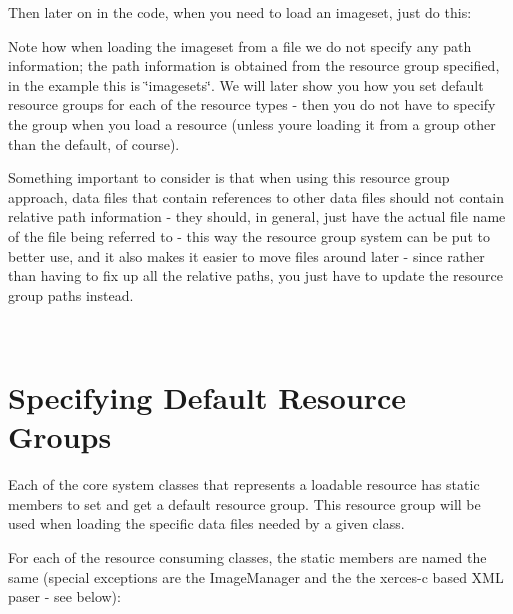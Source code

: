 Then later on in the code, when you need to load an imageset, just do this\+: 
\begin{DoxyCode}{0}
\DoxyCodeLine{    \textcolor{stringliteral}{"WindowsLook.imageset"}, \textcolor{stringliteral}{"imagesets"});}
\end{DoxyCode}


Note how when loading the imageset from a file we do not specify any path information; the path information is obtained from the resource group specified, in the example this is {\ttfamily \char`\"{}imagesets\char`\"{}}. We will later show you how you set default resource groups for each of the resource types -\/ then you do not have to specify the group when you load a resource (unless you\textquotesingle{}re loading it from a group other than the default, of course).

Something important to consider is that when using this resource group approach, data files that contain references to other data files should not contain relative path information -\/ they should, in general, just have the actual file name of the file being referred to -\/ this way the resource group system can be put to better use, and it also makes it easier to move files around later -\/ since rather than having to \textquotesingle{}fix up\textquotesingle{} all the relative paths, you just have to update the resource group paths instead.

~\newline
 \hypertarget{resprov_tutorial_resprov_tutorial_default_resource_groups}{}\section{Specifying Default Resource Groups}\label{resprov_tutorial_resprov_tutorial_default_resource_groups}
Each of the core system classes that represents a loadable resource has static members to set and get a default resource group. This resource group will be used when loading the specific data files needed by a given class.

For each of the resource consuming classes, the static members are named the same (special exceptions are the Image\+Manager and the the xerces-\/c based X\+ML paser -\/ see below)\+: 
\begin{DoxyCode}{0}
\end{DoxyCode}



